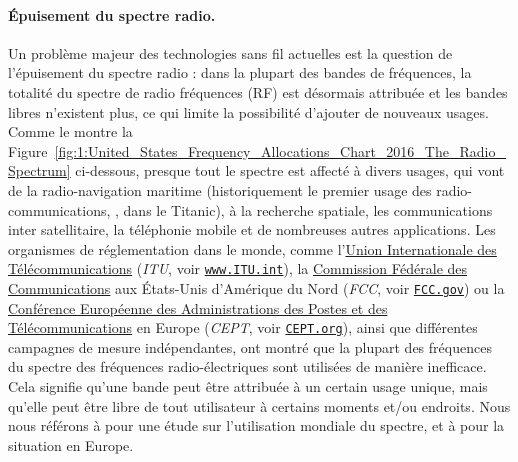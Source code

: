 \begin{resume_fr}
\paragraph{Épuisement du spectre radio.}
%
Un problème majeur des technologies sans fil actuelles est la question de l'épuisement du spectre radio :
dans la plupart des bandes de fréquences, la totalité du spectre de radio fréquences (RF) est désormais attribuée et les bandes libres n'existent plus, ce qui limite la possibilité d'ajouter de nouveaux usages.
Comme le montre la Figure~\ref{fig:1:United_States_Frequency_Allocations_Chart_2016_The_Radio_Spectrum} ci-dessous,
presque tout le spectre
est affecté à divers usages, qui vont de la radio-navigation maritime (historiquement le premier usage des radio-communications, \eg, dans le Titanic), à la recherche spatiale, les communications inter satellitaire, la téléphonie mobile et de nombreuses autres applications.
%
Les organismes de réglementation dans le monde, comme l'\href{https://www.itu.int/en/Pages/default.aspx}{Union Internationale des Télécommunications} (\emph{ITU}, voir \href{https://www.itu.int/}{\texttt{www.ITU.int}}),
la \href{https://www.fcc.gov/}{Commission Fédérale des Communications} aux États-Unis d'Amérique du Nord (\emph{FCC}, voir \href{https://www.fcc.gov/}{\texttt{FCC.gov}})
ou la \href{https://cept.org}{Conférence Européenne des Administrations des Postes et des Télécommunications} en Europe (\emph{CEPT}, voir \href{https://www.CEPT.org/}{\texttt{CEPT.org}}),
ainsi que différentes campagnes de mesure indépendantes, ont montré que la plupart des fréquences du spectre des fréquences radio-électriques sont utilisées de manière inefficace.
Cela signifie qu'une bande peut être attribuée à un certain usage unique, mais qu'elle peut être libre de tout utilisateur à certains moments et/ou endroits.
Nous nous référons à \cite{patil2011survey} pour une étude sur l'utilisation mondiale du spectre, et à \cite{valenta2010survey} pour la situation en Europe.



\end{resume_fr}
